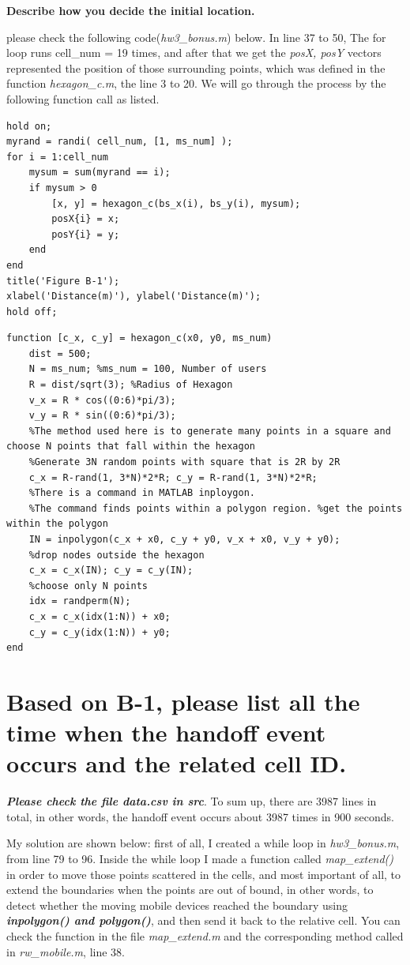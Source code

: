 \documentclass{article}
\begin{document}
\textbf{Describe how you decide the initial location.}

please check the following code(\emph{hw3\_bonus.m}) below. In line 37 to 50, The for loop runs cell\_num = 19 times, and after that we get the \emph{posX, posY} vectors represented the position of those surrounding points, which was defined in the function \emph{hexagon\_c.m}, the line 3 to 20. We will go through the process by the following function call as listed.
\pagebreak

\begin{lstlisting}[caption = {hw3\_bonus.m}]
%% B-2. Please plot a map with all mobile devices in their initial location.
hold on;
myrand = randi( cell_num, [1, ms_num] );
for i = 1:cell_num
    mysum = sum(myrand == i);
    if mysum > 0
        [x, y] = hexagon_c(bs_x(i), bs_y(i), mysum);
        posX{i} = x;
        posY{i} = y;
    end
end
title('Figure B-1');
xlabel('Distance(m)'), ylabel('Distance(m)');
hold off;
\end{lstlisting}

\begin{lstlisting}[caption = {hexagon\_c.m}]
function [c_x, c_y] = hexagon_c(x0, y0, ms_num)
    dist = 500;
    N = ms_num; %ms_num = 100, Number of users
    R = dist/sqrt(3); %Radius of Hexagon
    v_x = R * cos((0:6)*pi/3);
    v_y = R * sin((0:6)*pi/3);
    %The method used here is to generate many points in a square and choose N points that fall within the hexagon
    %Generate 3N random points with square that is 2R by 2R
    c_x = R-rand(1, 3*N)*2*R; c_y = R-rand(1, 3*N)*2*R;
    %There is a command in MATLAB inploygon.
    %The command finds points within a polygon region. %get the points within the polygon
    IN = inpolygon(c_x + x0, c_y + y0, v_x + x0, v_y + y0);
    %drop nodes outside the hexagon
    c_x = c_x(IN); c_y = c_y(IN);
    %choose only N points
    idx = randperm(N);
    c_x = c_x(idx(1:N)) + x0;
    c_y = c_y(idx(1:N)) + y0;
end
\end{lstlisting}
\section{Based on B-1, please list all the time when the handoff event occurs and the related cell ID.}

\textbf{\textit{Please check the file data.csv in src}}. To sum up, there are 3987 lines in total, in other words, the handoff event occurs about 3987 times in 900 seconds.

My solution are shown below: first of all, I created a while loop in \emph{hw3\_bonus.m}, from line 79 to 96. Inside the while loop I made a function called \emph{map\_extend()} in order to move those points scattered in the cells, and most important of all, to extend the boundaries when the points are out of bound, in other words, to detect whether the moving mobile devices reached the boundary using \textbf{\textit{inpolygon() and polygon()}}, and then send it back to the relative cell. You can check the function in the file \emph{map\_extend.m} and the corresponding method called in \emph{rw\_mobile.m}, line 38.
\end{document}
